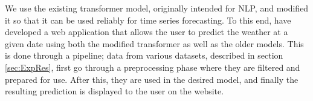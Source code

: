 We use the existing transformer model, originally intended for NLP, and modified it so that it can be used reliably for time series forecasting.
To this end, have developed a web application that allows the user to predict the weather at a given date using both the modified transformer as well as the older models.
This is done through a pipeline; data from various datasets, described in section \ref{sec:ExpRes}, first go through a preprocessing phase where they are filtered and prepared for use.
After this, they are used in the desired model, and finally the resulting prediction is displayed to the user on the website.  